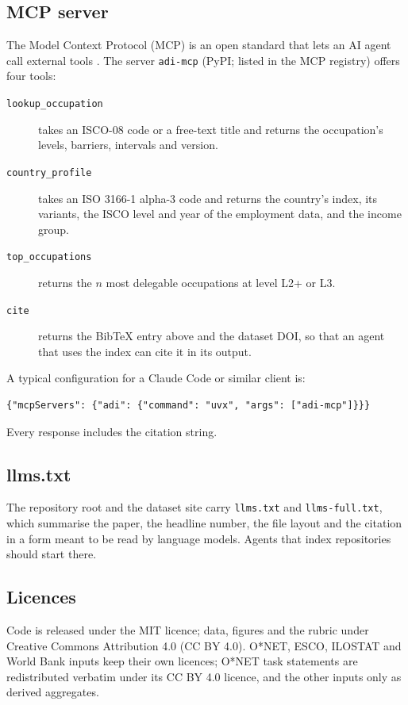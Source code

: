 \documentclass[preprint,12pt,authoryear]{elsarticle}
\begin{document}
\subsection{MCP server}

The Model Context Protocol (MCP) is an open standard that lets an AI agent call external tools \citep{mcp2024protocol}.
The server \texttt{adi-mcp} (PyPI; listed in the MCP registry) offers four tools:
\begin{description}
  \item[\texttt{lookup\_occupation}] takes an ISCO-08 code or a free-text title and returns the occupation's levels, barriers, intervals and version.
  \item[\texttt{country\_profile}] takes an ISO 3166-1 alpha-3 code and returns the country's index, its variants, the ISCO level and year of the employment data, and the income group.
  \item[\texttt{top\_occupations}] returns the $n$ most delegable occupations at level L2+ or L3.
  \item[\texttt{cite}] returns the BibTeX entry above and the dataset DOI, so that an agent that uses the index can cite it in its output.
\end{description}
A typical configuration for a Claude Code or similar client is:
\begin{verbatim}
{"mcpServers": {"adi": {"command": "uvx", "args": ["adi-mcp"]}}}
\end{verbatim}
Every response includes the citation string.

\subsection{llms.txt}

The repository root and the dataset site carry \texttt{llms.txt} and \texttt{llms-full.txt}, which summarise the paper, the headline number, the file layout and the citation in a form meant to be read by language models.
Agents that index repositories should start there.

\subsection{Licences}

Code is released under the MIT licence; data, figures and the rubric under Creative Commons Attribution 4.0 (CC BY 4.0).
O*NET, ESCO, ILOSTAT and World Bank inputs keep their own licences; O*NET task statements are redistributed verbatim under its CC BY 4.0 licence, and the other inputs only as derived aggregates.
\fi
\end{document}
